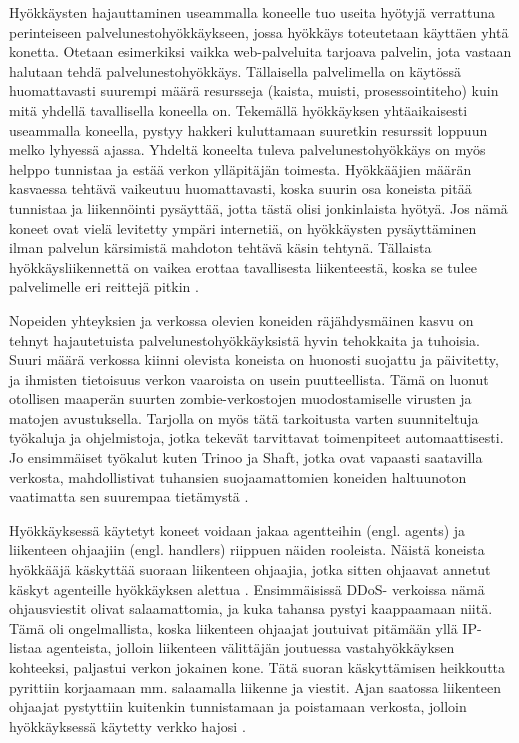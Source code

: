 Hyökkäysten hajauttaminen useammalla koneelle tuo useita hyötyjä verrattuna
perinteiseen palvelunestohyökkäykseen, jossa hyökkäys toteutetaan käyttäen yhtä
konetta. Otetaan esimerkiksi vaikka web-palveluita tarjoava palvelin, jota
vastaan halutaan tehdä palvelunestohyökkäys. Tällaisella palvelimella on
käytössä huomattavasti suurempi määrä resursseja (kaista, muisti,
prosessointiteho) kuin mitä yhdellä tavallisella koneella on. Tekemällä
hyökkäyksen yhtäaikaisesti useammalla koneella, pystyy hakkeri kuluttamaan
suuretkin resurssit loppuun melko lyhyessä ajassa. Yhdeltä koneelta tuleva
palvelunestohyökkäys on myös helppo tunnistaa ja estää verkon ylläpitäjän
toimesta. Hyökkääjien määrän kasvaessa tehtävä vaikeutuu huomattavasti, koska
suurin osa koneista pitää tunnistaa ja liikennöinti pysäyttää, jotta tästä olisi
jonkinlaista hyötyä. Jos nämä koneet ovat vielä levitetty ympäri internetiä, on
hyökkäysten pysäyttäminen ilman palvelun kärsimistä mahdoton tehtävä käsin
tehtynä. Tällaista hyökkäysliikennettä on vaikea erottaa tavallisesta
liikenteestä, koska se tulee palvelimelle eri reittejä pitkin \cite{DDOS}.

Nopeiden yhteyksien ja verkossa olevien koneiden räjähdysmäinen kasvu on tehnyt
hajautetuista palvelunestohyökkäyksistä hyvin tehokkaita ja tuhoisia. Suuri
määrä verkossa kiinni olevista koneista on huonosti suojattu ja päivitetty, ja
ihmisten tietoisuus verkon vaaroista on usein puutteellista. Tämä on luonut
otollisen maaperän suurten zombie-verkostojen muodostamiselle virusten ja
matojen avustuksella. Tarjolla on myös tätä tarkoitusta varten suunniteltuja
työkaluja ja ohjelmistoja, jotka tekevät tarvittavat toimenpiteet
automaattisesti. Jo ensimmäiset työkalut kuten Trinoo ja Shaft, jotka ovat
vapaasti saatavilla verkosta, mahdollistivat tuhansien suojaamattomien koneiden
haltuunoton vaatimatta sen suurempaa tietämystä \cite{DDOS}.

Hyökkäyksessä käytetyt koneet voidaan jakaa agentteihin (engl. agents) ja
liikenteen ohjaajiin (engl. handlers) riippuen näiden rooleista. Näistä
koneista hyökkääjä käskyttää suoraan liikenteen ohjaajia, jotka sitten ohjaavat
annetut käskyt agenteille hyökkäyksen alettua \cite{WEBS}\cite{DDOS}. Ensimmäisissä DDoS-
verkoissa nämä ohjausviestit olivat salaamattomia, ja kuka tahansa pystyi
kaappaamaan niitä. Tämä oli ongelmallista, koska liikenteen ohjaajat joutuivat
pitämään yllä IP-listaa agenteista, jolloin liikenteen välittäjän joutuessa
vastahyökkäyksen kohteeksi, paljastui verkon jokainen kone. Tätä suoran
käskyttämisen heikkoutta pyrittiin korjaamaan mm. salaamalla liikenne ja
viestit. Ajan saatossa liikenteen ohjaajat pystyttiin kuitenkin tunnistamaan ja
poistamaan verkosta, jolloin hyökkäyksessä käytetty verkko hajosi \cite{DDOS}.

